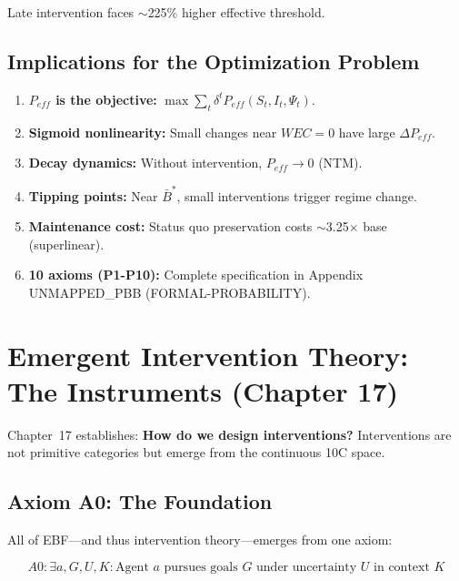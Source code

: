 Late intervention faces $\sim$225\% higher effective threshold.

\subsection{Implications for the Optimization Problem}

\begin{enumerate}[nosep]
\item \textbf{$P_{eff}$ is the objective:} $\max \sum_t \delta^t P_{eff}(S_t, I_t, \Psi_t)$.
\item \textbf{Sigmoid nonlinearity:} Small changes near $WEC = 0$ have large $\Delta P_{eff}$.
\item \textbf{Decay dynamics:} Without intervention, $P_{eff} \to 0$ (NTM).
\item \textbf{Tipping points:} Near $\bar{B}^*$, small interventions trigger regime change.
\item \textbf{Maintenance cost:} Status quo preservation costs $\sim$3.25$\times$ base (superlinear).
\item \textbf{10 axioms (P1-P10):} Complete specification in Appendix UNMAPPED_PBB (FORMAL-PROBABILITY).
\end{enumerate}

\section{Emergent Intervention Theory: The Instruments (Chapter 17)}
\label{sec:mp-eit}

Chapter~17 establishes: \textbf{How do we design interventions?} Interventions are not primitive categories but emerge from the continuous 10C space.

\subsection{Axiom A0: The Foundation}

All of EBF---and thus intervention theory---emerges from one axiom:

\begin{equation}
\boxed{
A0: \exists a, G, U, K: \text{Agent } a \text{ pursues goals } G \text{ under uncertainty } U \text{ in context } K
}
\label{eq:mp-axiom-a0}
\end{equation}

